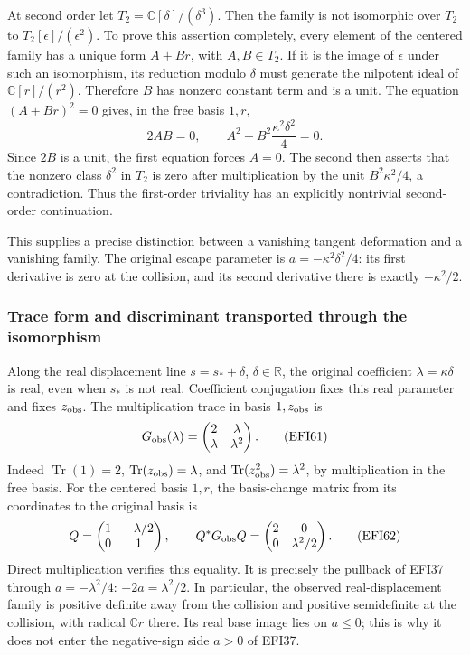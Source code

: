 \documentclass[
  10pt,
  a4paper,
]{article}
\begin{document}
At second order let \(T_2=\mathbb C[\delta]/(\delta^3)\). Then the
family is not isomorphic over \(T_2\) to \(T_2[\epsilon]/(\epsilon^2)\).
To prove this assertion completely, every element of the centered family
has a unique form \(A+B r\), with \(A,B\in T_2\). If it is the image of
\(\epsilon\) under such an isomorphism, its reduction modulo \(\delta\)
must generate the nilpotent ideal of \(\mathbb C[r]/(r^2)\). Therefore
\(B\) has nonzero constant term and is a unit. The equation
\((A+Br)^2=0\) gives, in the free basis \(1,r\), \[
2AB=0,\qquad
A^2+B^2\frac{\kappa^2\delta^2}{4}=0.
\tag{EFI60}
\] Since \(2B\) is a unit, the first equation forces \(A=0\). The second
then asserts that the nonzero class \(\delta^2\) in \(T_2\) is zero
after multiplication by the unit \(B^2\kappa^2/4\), a contradiction.
Thus the first-order triviality has an explicitly nontrivial
second-order continuation.

This supplies a precise distinction between a vanishing tangent
deformation and a vanishing family. The original escape parameter is
\(a=-\kappa^2\delta^2/4\): its first derivative is zero at the
collision, and its second derivative there is exactly \(-\kappa^2/2\).

\subsubsection{Trace form and discriminant transported through the
isomorphism}\label{trace-form-and-discriminant-transported-through-the-isomorphism}

Along the real displacement line \(s=s_*+\delta\),
\(\delta\in\mathbb R\), the original coefficient
\(\lambda=\kappa\delta\) is real, even when \(s_*\) is not real.
Coefficient conjugation fixes this real parameter and fixes
\(z_{\rm obs}\). The multiplication trace in basis \(1,z_{\rm obs}\) is
\[
G_{\rm obs}(\lambda)=
\begin{pmatrix}2&\lambda\\\lambda&\lambda^2\end{pmatrix}.
\tag{EFI61}
\] Indeed \(\operatorname{Tr}(1)=2\),
\(\operatorname{Tr}(z_{\rm obs})=\lambda\), and
\(\operatorname{Tr}(z_{\rm obs}^2)=\lambda^2\), by multiplication in the
free basis. For the centered basis \(1,r\), the basis-change matrix from
its coordinates to the original basis is \[
Q=\begin{pmatrix}1&-\lambda/2\\0&1\end{pmatrix},\qquad
Q^*G_{\rm obs}Q=
\begin{pmatrix}2&0\\0&\lambda^2/2\end{pmatrix}.
\tag{EFI62}
\] Direct multiplication verifies this equality. It is precisely the
pullback of EFI37 through \(a=-\lambda^2/4\): \(-2a=\lambda^2/2\). In
particular, the observed real-displacement family is positive definite
away from the collision and positive semidefinite at the collision, with
radical \(\mathbb C r\) there. Its real base image lies on \(a\le0\);
this is why it does not enter the negative-sign side \(a>0\) of EFI37.
\end{document}
